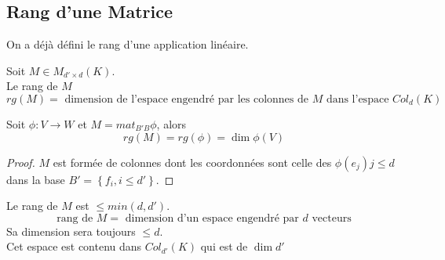\documentclass[../main.tex]{subfiles}
\begin{document}
\subsection{Rang d'une Matrice}
On a déjà défini le rang d'une application linéaire.
\begin{defn}\label{defn:rang_d_une_matrice}
	Soit $M \in M_{d'\times d} ( K) $.\\
	Le rang de $M$ 
	\[ 
		rg( M) = \text{ dimension de l'espace engendré par les colonnes de $M$ dans l'espace $Col_{d} ( K) $ } 
	\]
	
\end{defn}
\begin{propo}
Soit $\phi: V \to W$ et $M= mat_{B'B} \phi$, alors
\[ 
	rg( M) = rg( \phi) = \dim \phi( V) 
\]

\end{propo}
\begin{proof}
	$M$ est formée de colonnes dont les coordonnées sont celle des $\phi( e_j) j \leq d$ dans la base $B'= \left\{ f_i, i \leq d' \right\} $.
\end{proof}
\begin{rmq}
	Le rang de $M$ est $\leq min( d,d')  $.
	\[ 
	\text{ rang de  } M= \text{ dimension d'un espace engendré par $d$ vecteurs } 
	\]
	Sa dimension sera toujours $\leq d$.\\
	Cet espace est contenu dans $Col_{d'} ( K) $ qui est de $\dim d'$
\end{rmq}
\end{document}

